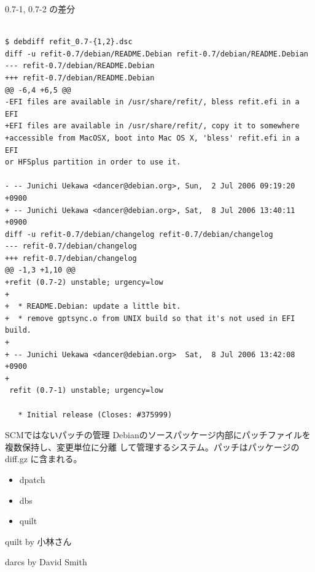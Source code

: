 \documentclass[cjk,dvipdfmx,12pt]{beamer}
\begin{document}
\begin{frame}[containsverbatim]{0.7-1, 0.7-2 の差分}

{\tiny

\begin{verbatim}

$ debdiff refit_0.7-{1,2}.dsc
diff -u refit-0.7/debian/README.Debian refit-0.7/debian/README.Debian
--- refit-0.7/debian/README.Debian
+++ refit-0.7/debian/README.Debian
@@ -6,4 +6,5 @@
-EFI files are available in /usr/share/refit/, bless refit.efi in a EFI
+EFI files are available in /usr/share/refit/, copy it to somewhere
+accessible from MacOSX, boot into Mac OS X, 'bless' refit.efi in a EFI
or HFSplus partition in order to use it.

- -- Junichi Uekawa <dancer@debian.org>, Sun,  2 Jul 2006 09:19:20 +0900
+ -- Junichi Uekawa <dancer@debian.org>, Sat,  8 Jul 2006 13:40:11 +0900
diff -u refit-0.7/debian/changelog refit-0.7/debian/changelog
--- refit-0.7/debian/changelog
+++ refit-0.7/debian/changelog
@@ -1,3 +1,10 @@
+refit (0.7-2) unstable; urgency=low
+
+  * README.Debian: update a little bit.
+  * remove gptsync.o from UNIX build so that it's not used in EFI build.
+
+ -- Junichi Uekawa <dancer@debian.org>  Sat,  8 Jul 2006 13:42:08 +0900
+
 refit (0.7-1) unstable; urgency=low

   * Initial release (Closes: #375999)
\end{verbatim}
} 
\end{frame}

\begin{frame}{SCMではないパッチの管理}
Debianのソースパッケージ内部にパッチファイルを複数保持し、変更単位に分離
して管理するシステム。パッチはパッケージの diff.gz に含まれる。

\begin{itemize}
 \item dpatch
 \item dbs
 \item quilt
\end{itemize}
 
\end{frame}

\begin{frame}

 quilt by 小林さん
\end{frame}


\begin{frame}

 darcs by David Smith
\end{frame}
\end{document}

